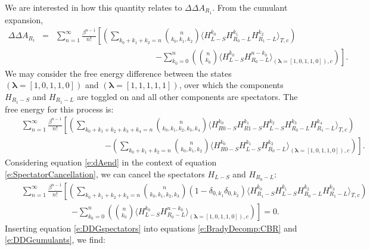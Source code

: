 \documentclass[%
 preprint,
 amsmath,amssymb,
 aps,
]{revtex4-1}
\renewcommand{\vec}[1]{{\bm{#1}}}
\begin{document}
 
We are interested in how this quantity relates to $\Delta \Delta A_{R_1}$.  From the cumulant expansion, 
 \begin{eqnarray}
 \Delta \Delta A_{R_1} &=&
 \sum_{n=1}^{\infty}  \frac{\beta^{n-1}}{n!} 
\left[
\left(
 \sum_{k_0+k_1+k_2=n} 
{ n \choose k_0,k_1,k_2 } \langle  H_{L-S}^{k_0} H_{R_0-L}^{k_1} H_{R_1-L}^{k_2} 
\rangle_{T,c}
\right) \right.  \label{e:DDGcumulants} \\ && \qquad \qquad \qquad \qquad \qquad \qquad \left. 
- 
 \sum_{k_0=0}^n 
\left( {n \choose k_0 } \langle  H_{L-S}^{k_0} H_{R_0-L}^{n-k_0} \rangle_{\left(\vec{\lambda}=\left[1,0,1,1,0\right] \right),c}
\right)
\right]. \nonumber
 \end{eqnarray}
We may consider the free energy difference between the states $\left(\vec{\lambda}=\left[1,0,1,1,0\right] \right)$ and 
$\left(\vec{\lambda}=\left[1,1,1,1,1\right] \right)$, over which the components $H_{R_1-S}$ and $H_{R_1-L}$ are toggled on and all other components are spectators.  The free energy for this process is:
 \begin{eqnarray}
 &&
 \sum_{n=1}^{\infty}  \frac{\beta^{n-1}}{n!} 
\left[
\left(
 \sum_{k_0+k_1+k_2+k_3+k_4=n} 
{ n \choose k_0,k_1,k_2,k_3,k_4 } \langle  H_{R0-S}^{k_0}H_{R1-S}^{k_1}H_{L-S}^{k_2} H_{R_0-L}^{k_3} H_{R_1-L}^{k_4} 
\rangle_{T,c}
\right) \right.  \label{e:dAend} \\ && \qquad \qquad \qquad \qquad \qquad  \left. 
- 
\left(
 \sum_{k_0+k_1+k_2=n} 
{ n \choose k_0,k_1,k_2 } \langle  H_{R0-S}^{k_0} H_{L-S}^{k_1} H_{R_0-L}^{k_2} 
\rangle_{\left(\vec{\lambda}=\left[1,0,1,1,0\right] \right),c}
\right) 
\right]. \nonumber
 \end{eqnarray}
%
Considering equation \ref{e:dAend} in the context of equation \ref{e:SpectatorCancellation}, we can cancel the spectators $H_{L-S}$ and $H_{R_0-L}$:
 \begin{eqnarray}
 &&
\sum_{n=1}^{\infty}  \frac{\beta^{n-1}}{n!} 
\left[
\left(
 \sum_{k_0+k_1+k_2+k_3=n} 
{ n \choose k_0,k_1,k_2,k_3} \left( 1- \delta_{0,k_1} \delta_{0,k_2}  \right) \langle  
H_{R_1-S}^{k_0}H_{L-S}^{k_1} H_{R_0-L}^{k_2} H_{R_1-L}^{k_3} 
\rangle_{T,c}
\right) \right. \label{e:DDGspectators} \\ && \qquad \qquad \qquad \left. 
- 
\sum_{k_0=0}^n 
\left( {n \choose k_0 } \langle  H_{L-S}^{k_0} H_{R_0-L}^{n-k_0} \rangle_{\left(\vec{\lambda}=\left[1,0,1,1,0\right] \right),c}
\right)
\right] = 0. \nonumber
\end{eqnarray}
Inserting equation \ref{e:DDGspectators} into equations \ref{e:BradyDecomp:CBR} and \ref{e:DDGcumulants}, we find:
\end{document}
